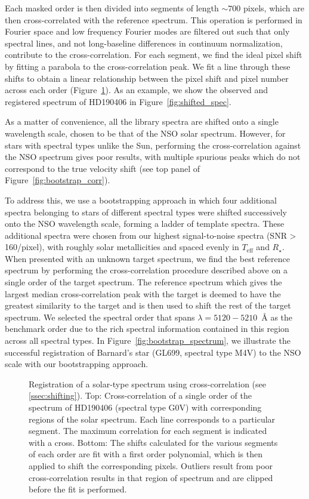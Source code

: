 \documentclass[preprint2]{aastex6}
\newcommand{\Rstar}{\ensuremath{R_{\star}}\xspace}
\newcommand{\teff}{\ensuremath{T_{\mathrm{eff}}}\xspace}
\newcommand{\angstrom}{\AA\xspace}
\begin{document}
Each masked order is then divided into segments of length $\sim 700$ pixels, which are then cross-correlated with the reference spectrum. This operation is performed in Fourier space and low frequency Fourier modes are filtered out such that only spectral lines, and not long-baseline differences in continuum normalization, contribute to the cross-correlation. For each segment, we find the ideal pixel shift by fitting a parabola to the cross-correlation peak. We fit a line through these shifts to obtain a linear relationship between the pixel shift and pixel number across each order (Figure~\ref{fig:corr_lags}). As an example, we show the observed and registered spectrum of HD190406 in Figure~\ref{fig:shifted_spec}.

As a matter of convenience, all the library spectra are shifted onto a single wavelength scale, chosen to be that of the NSO solar spectrum. However, for stars with spectral types unlike the Sun, performing the cross-correlation against the NSO spectrum gives poor results, with multiple spurious peaks which do not correspond to the true velocity shift (see top panel of Figure~\ref{fig:bootstrap_corr}).

To address this, we use a bootstrapping approach in which four additional spectra belonging to stars of different spectral types were shifted successively onto the NSO wavelength scale, forming a ladder of template spectra. These additional spectra were chosen from our highest signal-to-noise spectra (SNR > 160/pixel), with roughly solar metallicities and spaced evenly in \teff and \Rstar. When presented with an unknown target spectrum, we find the best reference spectrum by performing the cross-correlation procedure described above on a single order of the target spectrum. The reference spectrum which gives the largest median cross-correlation peak with the target is deemed to have the greatest similarity to the target and is then used to shift the rest of the target spectrum. We selected the spectral order that spans $\lambda=5120-5210$~\angstrom as the benchmark order due to the rich spectral information contained in this region across all spectral types. In Figure~\ref{fig:bootstrap_spectrum}, we illustrate the successful registration of Barnard's star (GL699, spectral type M4V) to the NSO scale with our bootstrapping approach.

\begin{figure}
	\caption{Registration of a solar-type spectrum using cross-correlation (see \autoref{ssec:shifting}). Top: Cross-correlation of a single order of the spectrum of HD190406 (spectral type G0V) with corresponding regions of the solar spectrum. Each line corresponds to a particular segment. The maximum correlation for each segment is indicated with a cross. Bottom: The shifts calculated for the various segments of each order are fit with a first order polynomial, which is then applied to shift the corresponding pixels. Outliers result from poor cross-correlation results in that region of spectrum and are clipped before the fit is performed.\label{fig:corr_lags}}
\end{figure}
\end{document}
